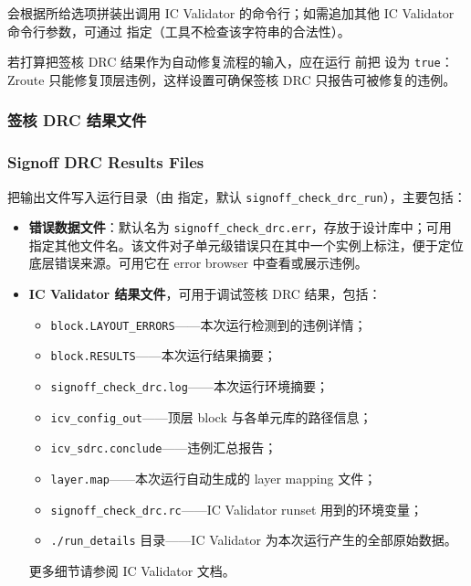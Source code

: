  会根据所给选项拼装出调用 IC Validator 的命令行；如需追加其他 IC Validator 命令行参数，可通过  指定（工具不检查该字符串的合法性）。

\begin{noteBox}
若打算把签核 DRC 结果作为自动修复流程的输入，应在运行  前把  设为 \texttt{true}：Zroute 只能修复顶层违例，这样设置可确保签核 DRC 只报告可被修复的违例。
\end{noteBox}

\subsubsection{签核 DRC 结果文件}
\subsubsection*{Signoff DRC Results Files}

 把输出文件写入运行目录（由  指定，默认 \texttt{signoff\_check\_drc\_run}），主要包括：
\begin{itemize}
  \item \textbf{错误数据文件}：默认名为 \texttt{signoff\_check\_drc.err}，存放于设计库中；可用  指定其他文件名。该文件对子单元级错误只在其中一个实例上标注，便于定位底层错误来源。可用它在 error browser 中查看或展示违例。
  \item \textbf{IC Validator 结果文件}，可用于调试签核 DRC 结果，包括：
        \begin{itemize}
          \item \texttt{block.LAYOUT\_ERRORS}——本次运行检测到的违例详情；
          \item \texttt{block.RESULTS}——本次运行结果摘要；
          \item \texttt{signoff\_check\_drc.log}——本次运行环境摘要；
          \item \texttt{icv\_config\_out}——顶层 block 与各单元库的路径信息；
          \item \texttt{icv\_sdrc.conclude}——违例汇总报告；
          \item \texttt{layer.map}——本次运行自动生成的 layer mapping 文件；
          \item \texttt{signoff\_check\_drc.rc}——IC Validator runset 用到的环境变量；
          \item \texttt{./run\_details} 目录——IC Validator 为本次运行产生的全部原始数据。
        \end{itemize}
        更多细节请参阅 IC Validator 文档。
\end{itemize}


